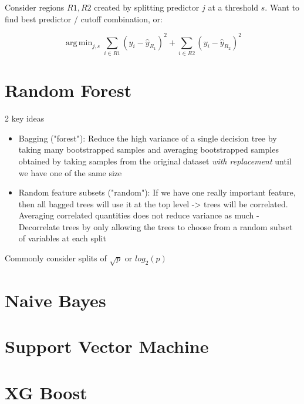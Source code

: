 \documentclass{article}
\DeclareMathOperator*{\argmin}{arg\,min}
\begin{document}
Consider regions $R1, R2$ created by splitting predictor $j$ at a threshold $s$. Want to find best predictor / cutoff combination, or:

\begin{equation*}
	\argmin_{j, s} \sum_{i \in R1} (y_i - \hat{y}_{R_1})^2 + \sum_{i \in R2} (y_i - \hat{y}_{R_2})^2
\end{equation*}

\section{Random Forest}
2 key ideas
\begin{itemize}
	\item Bagging ("forest"): Reduce the high variance of a single decision tree by taking many bootstrapped samples and averaging bootstrapped samples obtained by taking samples 	from the original dataset \textit{with replacement} until we have one of the same size
	\item Random feature subsets ("random"): If we have one really important feature, then all bagged trees will use it at the top level -> trees will be correlated. Averaging correlated 		quantities does not reduce variance as much
		- Decorrelate trees by only allowing the trees to choose from a random subset of variables at each split
\end{itemize}

Commonly consider splits of $\sqrt{p}$ or $log_2(p)	$

\section{Naive Bayes}

\section{Support Vector Machine}

\section{XG Boost}
\end{document}
